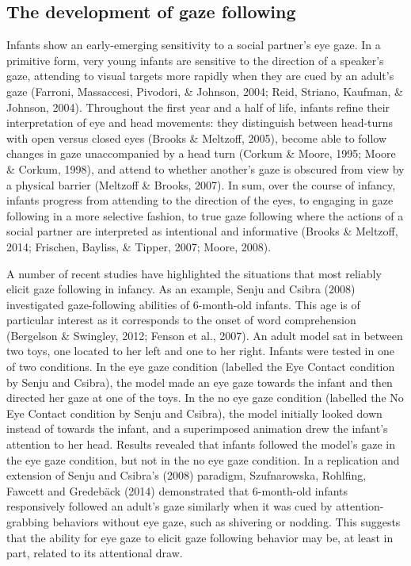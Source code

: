 \documentclass[,man,floatsintext]{apa6}
\begin{document}
\hypertarget{the-development-of-gaze-following}{%
\subsection{The development of gaze following}\label{the-development-of-gaze-following}}

Infants show an early-emerging sensitivity to a social partner's eye gaze. In a primitive form, very young infants are sensitive to the direction of a speaker's gaze, attending to visual targets more rapidly when they are cued by an adult's gaze (Farroni, Massaccesi, Pivodori, \& Johnson, 2004; Reid, Striano, Kaufman, \& Johnson, 2004). Throughout the first year and a half of life, infants refine their interpretation of eye and head movements: they distinguish between head-turns with open versus closed eyes (Brooks \& Meltzoff, 2005), become able to follow changes in gaze unaccompanied by a head turn (Corkum \& Moore, 1995; Moore \& Corkum, 1998), and attend to whether another's gaze is obscured from view by a physical barrier (Meltzoff \& Brooks, 2007). In sum, over the course of infancy, infants progress from attending to the direction of the eyes, to engaging in gaze following in a more selective fashion, to true gaze following where the actions of a social partner are interpreted as intentional and informative (Brooks \& Meltzoff, 2014; Frischen, Bayliss, \& Tipper, 2007; Moore, 2008).

A number of recent studies have highlighted the situations that most reliably elicit gaze following in infancy. As an example, Senju and Csibra (2008) investigated gaze-following abilities of 6-month-old infants. This age is of particular interest as it corresponds to the onset of word comprehension (Bergelson \& Swingley, 2012; Fenson et al., 2007). An adult model sat in between two toys, one located to her left and one to her right. Infants were tested in one of two conditions. In the eye gaze condition (labelled the Eye Contact condition by Senju and Csibra), the model made an eye gaze towards the infant and then directed her gaze at one of the toys. In the no eye gaze condition (labelled the No Eye Contact condition by Senju and Csibra), the model initially looked down instead of towards the infant, and a superimposed animation drew the infant's attention to her head. Results revealed that infants followed the model's gaze in the eye gaze condition, but not in the no eye gaze condition. In a replication and extension of Senju and Csibra's (2008) paradigm, Szufnarowska, Rohlfing, Fawcett and Gredebäck (2014) demonstrated that 6-month-old infants responsively followed an adult's gaze similarly when it was cued by attention-grabbing behaviors without eye gaze, such as shivering or nodding. This suggests that the ability for eye gaze to elicit gaze following behavior may be, at least in part, related to its attentional draw.
\end{document}
